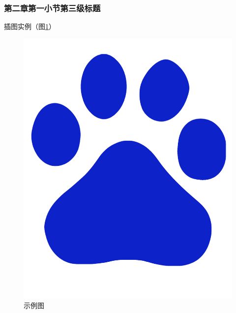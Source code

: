 \documentclass[twoside]{CUGThesis}
\begin{document}
	\subsubsection{第二章第一小节第三级标题}
	插图实例（图\ref{Fig:example}）
	\begin{figure}[!t]
		\centering
		\includegraphics[scale=0.5]{Figures/example.jpg}
		\caption{示例图}
		\label{Fig:example}
	\end{figure}
\end{document}
